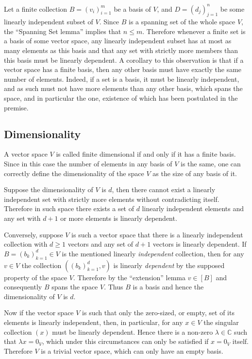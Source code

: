 \documentclass[a4paper]{article}
\newcommand{\brac}[1]{\ensuremath{\left( #1 \right)}}
\newcommand{\spn}[1]{\ensuremath{\left[ #1 \right]}}
\begin{document}
Let a finite collection $B = \brac{v_i}_{i=1}^m$ be a basis of $V$, and $D = \brac{d_j}_{j=1}^n$ be some linearly independent subset of $V$. Since $B$ is a spanning set of the whole space $V$, the ``Spanning Set lemma'' implies that $n\leq m$. Therefore whenever a finite set is a basis of some vector space, any linearly independent subset has at most as many elements as this basis and that any set with strictly more members than this basis must be linearly dependent. A corollary to this observation is that if a vector space has a finite basis, then any other basis must have exactly the same number of elements. Indeed, if a set is a basis, it must be linearly independent, and as such must not have more elements than any other basis, which spans the space, and in particular the one, existence of which has been postulated in the premise.

\subsection{Dimensionality} %
\label{sec:dimensionality}
A vector space $V$ is called finite dimensional if and only if it has a finite basis. Since in this case the number of elements in any basis of $V$ is the same, one can correctly define the dimensionality of the space $V$ as the size of any basis of it.

Suppose the dimensionality of $V$ is $d$, then there cannot exist a linearly independent set with strictly more elements without contradicting itself. Therefore in such space there exists a set of $d$ linearly independent elements and any set with $d+1$ or more elements is linearly dependent.

Conversely, suppose $V$ is such a vector space that there is a linearly independent collection with $d\geq 1$ vectors and any set of $d+1$ vectors is linearly dependent. If $B=\brac{b_k}_{k=1}^d \in V$ is the mentioned linearly \emph{independent} collection, then for any $v \in V$ the collection $\brac{\brac{b_k}_{k=1}^d, v}$ is linearly \emph{dependent} by the supposed property of the space $V$. Therefore by the ``extension'' lemma $v\in \spn{B}$ and consequently $B$ spans the space $V$. Thus $B$ is a basis and hence the dimensionality of $V$ is $d$.

Now if the vector space $V$ is such that only the zero-sized, or empty, set of its elements is linearly independent, then, in particular, for any $x \in V$ the singular collection $\brac{x}$ must be linearly dependent. Hence there is a non-zero $\lambda \in \mathbb{C}$ such that $\lambda x = 0_V$, which under this circumstances can only be satisfied if $x = 0_V$ itself. Therefore $V$ is a trivial vector space, which can only have an empty basis.
\end{document}
